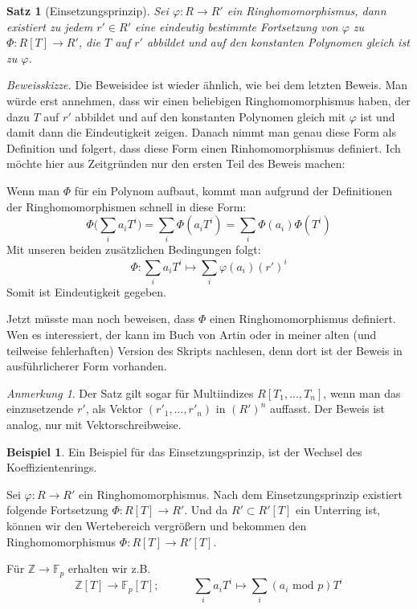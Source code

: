 \documentclass{article}
\newtheorem*{satz}{Satz}
\theoremstyle{definition}
\newtheorem*{zb}{Beispiel}
\theoremstyle{remark}
\newtheorem*{anm}{Anmerkung}
\begin{document}
\begin{satz} [Einsetzungsprinzip] Sei $\varphi: R\to R'$ ein Ringhomomorphismus, dann existiert zu jedem
$r' \in R'$ eine eindeutig bestimmte Fortsetzung von $\varphi$ zu $\Phi:R[T] \to R'$, die $T$ auf $r'$ abbildet
und auf den konstanten Polynomen gleich ist zu $\varphi$.
\end{satz}
\textit{Beweisskizze.} Die Beweisidee ist wieder ähnlich, wie bei dem letzten Beweis. Man würde erst annehmen,
dass wir einen beliebigen Ringhomomorphismus haben, der dazu $T$ auf $r'$ abbildet und auf den konstanten
Polynomen gleich mit $\varphi$ ist und damit dann die Eindeutigkeit zeigen.
Danach nimmt man genau diese Form als Definition und folgert, dass diese Form einen Rinhomomorphismus definiert.
Ich möchte hier aus Zeitgründen nur den ersten Teil des Beweis machen:

\vspace{0.7em}
Wenn man $\Phi$ für ein Polynom aufbaut, kommt man aufgrund der Definitionen der Ringhomomorphismen schnell in
diese Form:
\[\Phi\Big(\sum_i a_i T^i\Big)=\sum_i \Phi(a_i T^i)=\sum_i \Phi(a_i)\Phi(T^i)\]
Mit unseren beiden zusätzlichen Bedingungen folgt:
\[\Phi:\sum_i a_i T^i \mapsto \sum_i \varphi(a_i) (r')^i\]
Somit ist Eindeutigkeit gegeben. 

\vspace{0.7em}
Jetzt müsste man noch beweisen, dass $\Phi$ einen Ringhomomorphismus definiert. Wen
es interessiert, der kann im Buch von Artin oder in meiner alten (und teilweise fehlerhaften) Version des
Skripts nachlesen, denn dort ist der Beweis in ausführlicherer Form vorhanden.

\begin{anm}
Der Satz gilt sogar für Multiindizes $R[T_1,...,T_n]$, wenn man das einzusetzende $r'$, als Vektor
$(r'_1,...,r'_n)$ in $(R')^n$ auffasst. Der Beweis ist analog, nur mit Vektorschreibweise.
\end{anm}

\begin{zb}
Ein Beispiel für das Einsetzungsprinzip, ist der Wechsel des Koeffizientenrings.

Sei $\varphi: R\to R'$ ein Ringhomomorphismus. Nach dem Einsetzungsprinzip existiert folgende Fortsetzung
$\Phi:R[T]\to R'$. Und da $R'\subset R'[T]$ ein Unterring ist, können wir den Wertebereich vergrößern und
bekommen den Ringhomomorphismus $\Phi:R[T]\to R'[T]$.
\end{zb}

Für $\mathbb Z \to\mathbb F_p$ erhalten wir z.B.
\[\mathbb Z[T] \to\mathbb F_p[T]; \hspace{3em} \sum_i a_i T^i \longmapsto \sum_i (a_i \text{ mod } p) T^i\]
\end{document}
